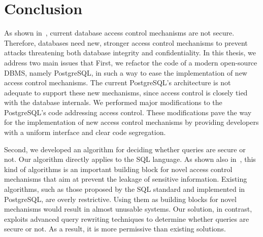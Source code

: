 \section{Conclusion}

As shown in~\cite{guarnieri2016strong}, current database access control mechanisms are not secure.
%
Therefore, databases need new, stronger access control mechanisms to prevent attacks threatening both database integrity and confidentiality. %
%
In this thesis, we address two main issues that 
%
First, we refactor the code of a modern open-source DBMS, namely PostgreSQL, in such a way to ease the implementation of new access control mechanisms.
%
The current PostgreSQL's architecture is not adequate to support these new mechanisms, since access control is closely tied with the database internals.
%
We performed  major modifications to the PostgreSQL's code addressing access control.
%
%
These modifications pave the way for the implementation of new access control mechanisms by providing developers with a uniform interface and clear code segregation.


Second, we developed an algorithm for deciding whether queries are secure or not.
%
Our algorithm directly applies to the SQL language.
%
As shown also in~\cite{guarnieri2016strong}, this kind of algorithms is an important building block for novel access control mechanisms that aim at prevent the leakage of sensitive information.
%
Existing algorithms, such as those proposed by the SQL standard and implemented in PostgreSQL, are overly restrictive.
%
Using them as building blocks for novel mechanisms would result in almost unusable systems.
%
Our solution, in contrast, exploits advanced query rewriting techniques to determine whether queries are secure or not. 
%
As a result, it is more permissive than existing solutions.





